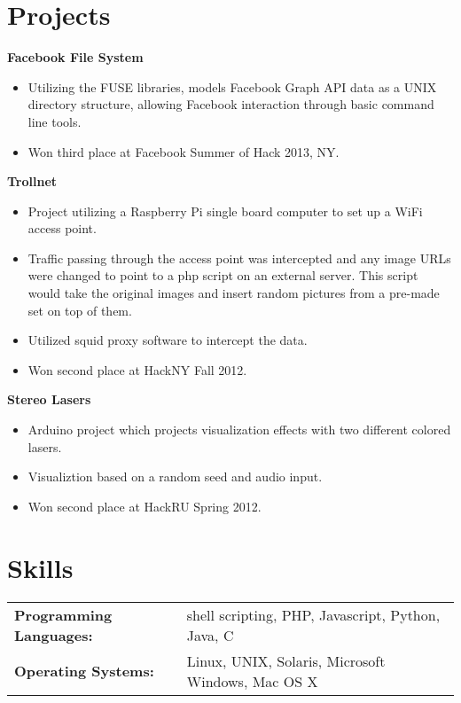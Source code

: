 \documentclass[centered,overlapped]{res}
\begin{document}
\begin{resume}

\section{Projects}

	{\bf Facebook File System}
	\begin{itemize} \itemsep -2pt
		\item Utilizing the FUSE libraries, models Facebook Graph API data as a
            UNIX directory structure, allowing Facebook interaction through
            basic command line tools.
        \item Won third place at Facebook Summer of Hack 2013, NY.
	\end{itemize}

	{\bf Trollnet}
	\begin{itemize} \itemsep -2pt
		\item Project utilizing a Raspberry Pi single board computer to set up a WiFi access point.
		\item Traffic passing through the access point was intercepted and any image URLs were changed to point to a php script on an external server. This script would take the original images and insert random pictures from a pre-made set on top of them.
		\item Utilized squid proxy software to intercept the data.
		\item Won second place at HackNY Fall 2012.
	\end{itemize}

	{\bf Stereo Lasers}
	\begin{itemize} \itemsep -2pt
		\item Arduino project which projects visualization effects with two different colored lasers.
		\item Visualiztion based on a random seed and audio input.
		\item Won second place at HackRU Spring 2012.
	\end{itemize}

\section{Skills}
	\begin{tabular}{l l}
		\noindent \textbf{Programming Languages:} & shell scripting, PHP, Javascript, Python, Java, C \\
		\noindent \textbf{Operating Systems:} & Linux, UNIX, Solaris, Microsoft Windows, Mac OS X \\
	\end{tabular}

\end{resume}
\end{document}
